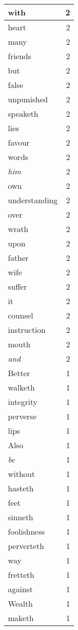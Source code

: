 \begin{center}
\begin{longtable}{l|r}
with & 2\\ \hline 
heart & 2\\ \hline 
many & 2\\ \hline 
friends & 2\\ \hline 
but & 2\\ \hline 
false & 2\\ \hline 
unpunished & 2\\ \hline 
speaketh & 2\\ \hline 
lies & 2\\ \hline 
favour & 2\\ \hline 
words & 2\\ \hline 
\emph{him} & 2\\ \hline 
own & 2\\ \hline 
understanding & 2\\ \hline 
over & 2\\ \hline 
wrath & 2\\ \hline 
upon & 2\\ \hline 
father & 2\\ \hline 
wife & 2\\ \hline 
suffer & 2\\ \hline 
it & 2\\ \hline 
counsel & 2\\ \hline 
instruction & 2\\ \hline 
mouth & 2\\ \hline 
\emph{and} & 2\\ \hline 
Better & 1\\ \hline 
walketh & 1\\ \hline 
integrity & 1\\ \hline 
perverse & 1\\ \hline 
lips & 1\\ \hline 
Also & 1\\ \hline 
\emph{be} & 1\\ \hline 
without & 1\\ \hline 
hasteth & 1\\ \hline 
feet & 1\\ \hline 
sinneth & 1\\ \hline 
foolishness & 1\\ \hline 
perverteth & 1\\ \hline 
way & 1\\ \hline 
fretteth & 1\\ \hline 
against & 1\\ \hline 
Wealth & 1\\ \hline 
maketh & 1\\ \hline 

\end{longtable}
\end{center}
